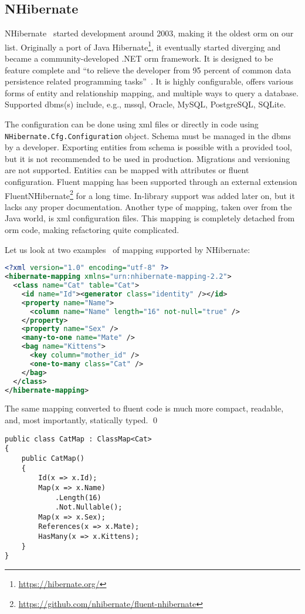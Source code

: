 \subsection{NHibernate}
\label{section:nhibernate}

NHibernate~\cite{nhibernate, nhibernateRepo} started development around 2003, making it the oldest \acrshort{orm} on our list. Originally a port of Java Hibernate\footnote{\url{https://hibernate.org/}}, it eventually started diverging and became a community-developed .NET \acrshort{orm} framework. It is designed to be feature complete and ``to relieve the developer from 95 percent of common data persistence related programming tasks''~\cite{nhibernate}. 
It is highly configurable, offers various forms of entity and relationship mapping, and multiple ways to query a database. Supported \acrshort{dbms}(s) include, e.g.,  \acrshort{mssql}, Oracle, MySQL, PostgreSQL, SQLite.

The configuration can be done using \acrshort{xml} files or directly in code using \texttt{NHibernate.Cfg.Configuration} object. 
Schema must be managed in the \acrshort{dbms} by a developer. Exporting entities from schema is possible with a provided tool, but it is not recommended to be used in production. Migrations and versioning are not supported. Entities can be mapped with attributes or fluent configuration. Fluent mapping has been supported through an external extension FluentNHibernate\footnote{\url{https://github.com/nhibernate/fluent-nhibernate}} for a long time. In-library support was added later on, but it lacks any proper documentation. Another type of mapping, taken over from the Java world, is \acrshort{xml} configuration files. This mapping is completely detached from \acrshort{orm} code, making refactoring quite complicated.

\begin{example}
\small
Let us look at two examples~\cite{fluentNH} of mapping supported by NHibernate:

\begin{lstlisting}[language=xml]
<?xml version="1.0" encoding="utf-8" ?>  
<hibernate-mapping xmlns="urn:nhibernate-mapping-2.2">  
  <class name="Cat" table="Cat">  
    <id name="Id"><generator class="identity" /></id>  
    <property name="Name">  
      <column name="Name" length="16" not-null="true" />  
    </property> 
    <property name="Sex" /> 
    <many-to-one name="Mate" />  
    <bag name="Kittens">  
      <key column="mother_id" />  
      <one-to-many class="Cat" />  
    </bag>  
  </class>  
</hibernate-mapping> 
\end{lstlisting}

The same mapping converted to fluent code is much more compact, readable, and, most importantly, statically typed. 
\qed

\begin{lstlisting}[language=CSharp]
public class CatMap : ClassMap<Cat>
{
    public CatMap()
    {
        Id(x => x.Id);
        Map(x => x.Name)
            .Length(16)
            .Not.Nullable();
        Map(x => x.Sex);
        References(x => x.Mate);
        HasMany(x => x.Kittens);
    }
}
\end{lstlisting}
\end{example}

